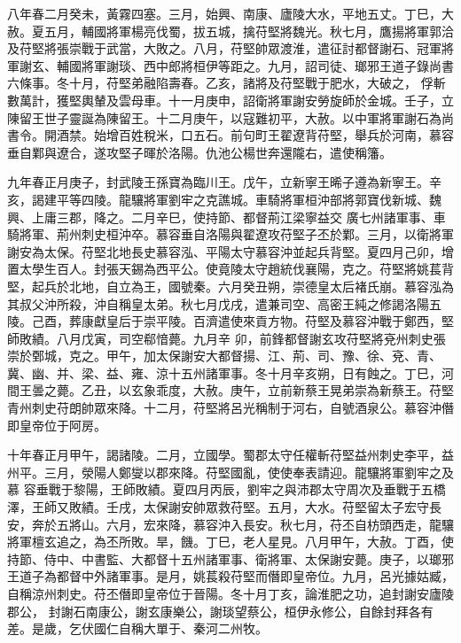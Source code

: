 \begin{pinyinscope}
 八年春二月癸未，黃霧四塞。三月，始興、南康、廬陵大水，平地五丈。丁巳，大赦。夏五月，輔國將軍楊亮伐蜀，拔五城，擒苻堅將魏光。秋七月，鷹揚將軍郭洽及苻堅將張崇戰于武當，大敗之。八月，苻堅帥眾渡淮，遣征討都督謝石、冠軍將軍謝玄、輔國將軍謝琰、西中郎將桓伊等距之。九月，詔司徒、瑯邪王道子錄尚書六條事。冬十月，苻堅弟融陷壽春。乙亥，諸將及苻堅戰于肥水，大破之，
 俘斬數萬計，獲堅輿輦及雲母車。十一月庚申，詔衛將軍謝安勞旋師於金城。壬子，立陳留王世子靈誕為陳留王。十二月庚午，以寇難初平，大赦。以中軍將軍謝石為尚書令。開酒禁。始增百姓稅米，口五石。前句町王翟遼背苻堅，舉兵於河南，慕容垂自鄴與遼合，遂攻堅子暉於洛陽。仇池公楊世奔還隴右，遣使稱籓。



 九年春正月庚子，封武陵王孫寶為臨川王。戊午，立新寧王晞子遵為新寧王。辛亥，謁建平等四陵。龍驤將軍劉牢之克譙城。車騎將軍桓沖部將郭寶伐新城、魏興、上庸三郡，降之。二月辛巳，使持節、都督荊江梁寧益交
 廣七州諸軍事、車騎將軍、荊州刺史桓沖卒。慕容垂自洛陽與翟遼攻苻堅子丕於鄴。三月，以衛將軍謝安為太保。苻堅北地長史慕容泓、平陽太守慕容沖並起兵背堅。夏四月己卯，增置太學生百人。封張天錫為西平公。使竟陵太守趙統伐襄陽，克之。苻堅將姚萇背堅，起兵於北地，自立為王，國號秦。六月癸丑朔，崇德皇太后褚氏崩。慕容泓為其叔父沖所殺，沖自稱皇太弟。秋七月戊戌，遣兼司空、高密王純之修謁洛陽五陵。己酉，葬康獻皇后于崇平陵。百濟遣使來貢方物。苻堅及慕容沖戰于鄭西，堅師敗績。八月戊寅，司空郗愔薨。九月辛
 卯，前鋒都督謝玄攻苻堅將兗州刺史張崇於鄄城，克之。甲午，加太保謝安大都督揚、江、荊、司、豫、徐、兗、青、冀、幽、并、梁、益、雍、涼十五州諸軍事。冬十月辛亥朔，日有蝕之。丁巳，河間王曇之薨。乙丑，以玄象乖度，大赦。庚午，立前新蔡王晃弟崇為新蔡王。苻堅青州刺史苻朗帥眾來降。十二月，苻堅將呂光稱制于河右，自號酒泉公。慕容沖僭即皇帝位于阿房。



 十年春正月甲午，謁諸陵。二月，立國學。蜀郡太守任權斬苻堅益州刺史李平，益州平。三月，滎陽人鄭燮以郡來降。苻堅國亂，使使奉表請迎。龍驤將軍劉牢之及慕
 容垂戰于黎陽，王師敗績。夏四月丙辰，劉牢之與沛郡太守周次及垂戰于五橋澤，王師又敗績。壬戌，太保謝安帥眾救苻堅。五月，大水。苻堅留太子宏守長安，奔於五將山。六月，宏來降，慕容沖入長安。秋七月，苻丕自枋頭西走，龍驤將軍檀玄追之，為丕所敗。旱，饑。丁巳，老人星見。八月甲午，大赦。丁酉，使持節、侍中、中書監、大都督十五州諸軍事、衛將軍、太保謝安薨。庚子，以瑯邪王道子為都督中外諸軍事。是月，姚萇殺苻堅而僭即皇帝位。九月，呂光據姑臧，自稱涼州刺史。苻丕僭即皇帝位于晉陽。冬十月丁亥，論淮肥之功，追封謝安廬陵郡公，
 封謝石南康公，謝玄康樂公，謝琰望蔡公，桓伊永修公，自餘封拜各有差。是歲，乞伏國仁自稱大單于、秦河二州牧。




\end{pinyinscope}
